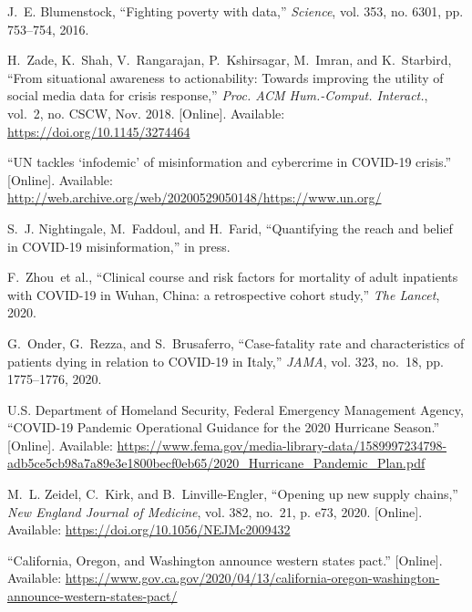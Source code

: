 \documentclass[11pt]{article}
\begin{document}
\begin{thebibliography}{10}
J.~E. Blumenstock, ``Fighting poverty with data,'' \emph{Science}, vol. 353,
  no. 6301, pp. 753--754, 2016.

\BIBentryALTinterwordspacing
H.~Zade, K.~Shah, V.~Rangarajan, P.~Kshirsagar, M.~Imran, and K.~Starbird,
  ``From situational awareness to actionability: Towards improving the utility
  of social media data for crisis response,'' \emph{Proc. ACM Hum.-Comput.
  Interact.}, vol.~2, no. CSCW, Nov. 2018. [Online]. Available:
  \url{https://doi.org/10.1145/3274464}
\BIBentrySTDinterwordspacing

\BIBentryALTinterwordspacing
``{UN tackles ‘infodemic’ of misinformation and cybercrime in COVID-19
  crisis}.'' [Online]. Available:
  \url{http://web.archive.org/web/20200529050148/https://www.un.org/}
\BIBentrySTDinterwordspacing

S.~J. Nightingale, M.~Faddoul, and H.~Farid, ``{Quantifying the reach and
  belief in COVID-19 misinformation},'' in press.

F.~Zhou~et al., ``{Clinical course and risk factors for mortality of adult
  inpatients with COVID-19 in Wuhan, China: a retrospective cohort study},''
  \emph{The Lancet}, 2020.

G.~Onder, G.~Rezza, and S.~Brusaferro, ``{Case-fatality rate and
  characteristics of patients dying in relation to COVID-19 in Italy},''
  \emph{JAMA}, vol. 323, no.~18, pp. 1775--1776, 2020.

\BIBentryALTinterwordspacing
{U.S. Department of Homeland Security, Federal Emergency Management Agency},
  ``{COVID-19 Pandemic Operational Guidance for the 2020 Hurricane Season}.''
  [Online]. Available:
  \url{https://www.fema.gov/media-library-data/1589997234798-adb5ce5cb98a7a89e3e1800becf0eb65/2020_Hurricane_Pandemic_Plan.pdf}
\BIBentrySTDinterwordspacing

\BIBentryALTinterwordspacing
M.~L. Zeidel, C.~Kirk, and B.~Linville-Engler, ``Opening up new supply
  chains,'' \emph{New England Journal of Medicine}, vol. 382, no.~21, p. e73,
  2020. [Online]. Available: \url{https://doi.org/10.1056/NEJMc2009432}
\BIBentrySTDinterwordspacing

\BIBentryALTinterwordspacing
``{California, Oregon, and Washington announce western states pact}.''
  [Online]. Available:
  \url{https://www.gov.ca.gov/2020/04/13/california-oregon-washington-announce-western-states-pact/}
\BIBentrySTDinterwordspacing


\end{thebibliography}
\end{document}
